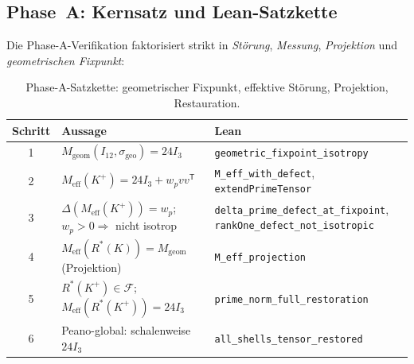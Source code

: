 \documentclass[11pt,a4paper]{article}
\begin{document}
	\subsection{Phase~A: Kernsatz und Lean-Satzkette}
	\label{sec:phase-a-chain}
	
	Die Phase-A-Verifikation faktorisiert strikt in \emph{Störung},
	\emph{Messung}, \emph{Projektion} und \emph{geometrischen Fixpunkt}:
	
	\begin{center}
	\end{center}
	
	\begin{table}[h!]
		\centering
		\small
		\begin{tabular}{cll}
			\hline
			\textbf{Schritt} & \textbf{Aussage} & \textbf{Lean} \\
			\hline
			1 & $M_{\mathrm{geom}}(I_{12},\sigma_{\mathrm{geo}})=24I_3$ &
			\texttt{geometric\_fixpoint\_isotropy} \\
			2 & $M_{\mathrm{eff}}(K^+)=24I_3+w_pvv^{\mathsf T}$ &
			\texttt{M\_eff\_with\_defect}, \texttt{extendPrimeTensor} \\
			3 & $\Delta(M_{\mathrm{eff}}(K^+))=w_p$; $w_p>0\Rightarrow$ nicht isotrop &
			\texttt{delta\_prime\_defect\_at\_fixpoint}, \texttt{rankOne\_defect\_not\_isotropic} \\
			4 & $M_{\mathrm{eff}}(R^*(K))=M_{\mathrm{geom}}$ (Projektion) &
			\texttt{M\_eff\_projection} \\
			5 & $R^*(K^+)\in\mathcal{F}$; $M_{\mathrm{eff}}(R^*(K^+))=24I_3$ &
			\texttt{prime\_norm\_full\_restoration} \\
			6 & Peano-global: schalenweise $24I_3$ &
			\texttt{all\_shells\_tensor\_restored} \\
			\hline
		\end{tabular}
		\caption{Phase-A-Satzkette: geometrischer Fixpunkt, effektive Störung, Projektion, Restauration.}
		\label{tab:phase-a-chain}
	\end{table}
	
\end{document}
